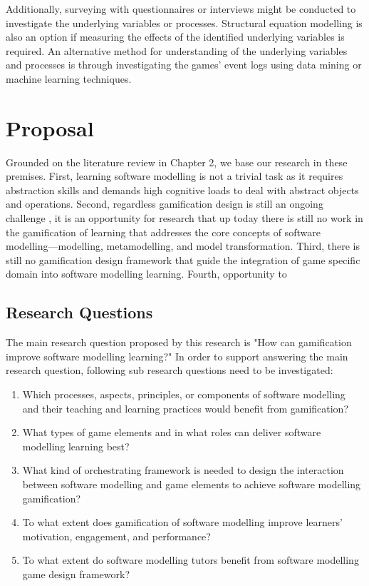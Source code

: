 \documentclass[12pt, a4paper]{report}
\begin{document}
Additionally, surveying with questionnaires or interviews might be conducted to investigate the underlying variables or processes. Structural equation modelling \cite{hair2016primer} is also an option if measuring the effects of the identified underlying variables is required. An alternative method for understanding of the underlying variables and processes is through investigating the games' event logs using data mining or machine learning techniques.


\chapter{Proposal}
Grounded on the literature review in Chapter 2, we base our research in these premises. First, learning software modelling is not a trivial task as it requires abstraction skills and demands high cognitive loads to deal with abstract objects and operations. Second, regardless gamification design is still an ongoing challenge \cite{Deterding2013}, it is an opportunity for research that up today there is still no work in the gamification of learning that addresses the core concepts of software modelling—modelling, metamodelling, and model transformation. Third, there is still no gamification design framework that guide the integration of game specific domain into software modelling learning. Fourth, opportunity to 

\section{Research Questions}
The main research question proposed by this research is "How can gamification improve software modelling learning?" In order to support answering the main research question, following sub research questions need to be investigated:
\begin{enumerate}
\item Which processes, aspects, principles, or components of software modelling and their teaching and learning practices would benefit from gamification?
\item What types of game elements and in what roles can deliver software modelling learning best? 
\item What kind of orchestrating framework is needed to design the interaction between software modelling and game elements to achieve software modelling gamification?
\item To what extent does gamification of software modelling improve learners' motivation, engagement, and performance?
\item To what extent do software modelling tutors benefit from software modelling game design framework?
\end{enumerate}
\end{document}
